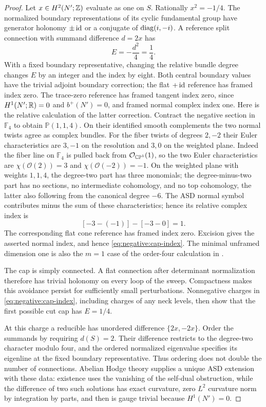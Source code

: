 \begin{proof}
Let $x\in H^2(N';\mathbb Z)$ evaluate as one on $S$.  Rationally $x^2=-1/4$.
The normalized boundary representations of its cyclic fundamental group
have generator holonomy $\pm\operatorname{id}$ or a conjugate of
$\operatorname{diag}(i,-i)$.  A reference split connection with summand difference
$d=2x$ has
\[
 E=-\frac{d^2}{4}=\frac14.
\]
With a fixed boundary representative, changing the relative bundle
degree changes $E$ by an integer and the index by eight.  Both central
boundary values have the trivial adjoint boundary correction; the
flat $+\operatorname{id}$ reference has framed index zero.  The trace-zero reference has
framed tangent index zero, since $H^1(N';\mathbb R)=0$ and $b^+(N')=0$,
and framed normal complex index one.  Here is the relative calculation
of the latter correction.  Contract the negative section in
$\mathbb F_4$ to obtain $\mathbb P(1,1,4)$.  On their identified smooth
complements the two normal twists agree as complex bundles.  For the
fiber twists of degrees $2,-2$ their Euler characteristics are $3,-1$
on the resolution and $3,0$ on the weighted plane.  Indeed the fiber
line on $\mathbb F_4$ is pulled back from $\mathcal O_{\mathbb{CP}^1}(1)$,
so the two Euler characteristics are $\chi(\mathcal O(2))=3$ and
$\chi(\mathcal O(-2))=-1$.  On the weighted plane with weights
$1,1,4$, the degree-two part has three monomials; the degree-minus-two
part has no sections, no intermediate cohomology, and no top
cohomology, the latter also following from the canonical degree $-6$.
The ASD normal
symbol contributes minus the sum of these characteristics; hence its
relative complex index is
\[
 [-3-(-1)]-[-3-0]=1.
\]
The corresponding flat cone reference has framed index zero.
Excision gives the asserted normal index, and hence
\eqref{eq:negative:cap-index}.  The minimal unframed dimension one is
also the $m=1$ case of the order-four calculation in
\cite[Lemmas~5.2--5.3]{FintushelStern1997}.

The cap is simply connected.  A flat connection after determinant
normalization therefore has trivial holonomy on every loop of the
sweep.  Compactness makes this avoidance persist for sufficiently
small perturbations.  Nonnegative charges in
\eqref{eq:negative:cap-index}, including charges of any neck levels,
then show that the first possible cut cap has $E=1/4$.

At this charge a reducible has unordered difference $\{2x,-2x\}$.
Order the summands by requiring $d(S)=2$.  Their difference restricts
to the degree-two character modulo four, and the ordered normalized
eigenvalue specifies its eigenline at the fixed boundary representative.
Thus ordering does not double the number of connections.  Abelian
Hodge theory supplies a unique ASD extension with these data: existence
uses the vanishing of the self-dual obstruction, while the difference
of two such solutions has exact curvature, zero $L^2$ curvature norm
by integration by parts, and then is gauge trivial because $H^1(N')=0$.


\end{proof}

